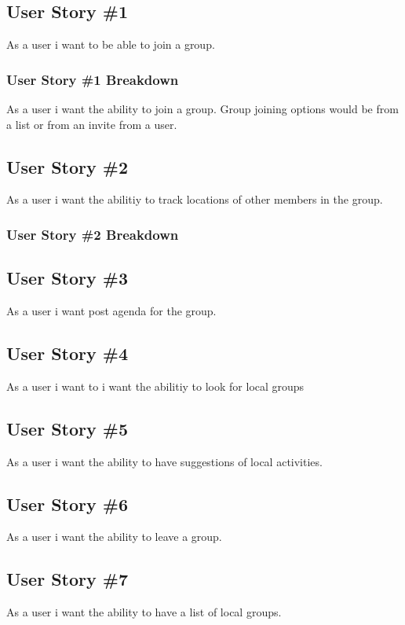 \subsection{User Story \#1 }
As a user i want to be able to join a group.

\subsubsection{User Story \#1 Breakdown}
As a user i want the ability to join a group. Group joining options would be from a list or from an invite from a user. 

\subsection{User Story \#2} 
As a user i want the abilitiy to track locations of other members in the group.

\subsubsection{User Story \#2 Breakdown}


\subsection{User Story \#3} 
As a user i want post agenda for the group.

\subsection{User Story \#4} 
As a user i want to i want the abilitiy to look for local groups

\subsection{User Story \#5} 
As a user i want the ability to have suggestions of local activities.

\subsection{User Story \#6} 
As a user i want the ability to leave a group.

\subsection{User Story \#7} 
As a user i want the ability to have a list of local groups.

